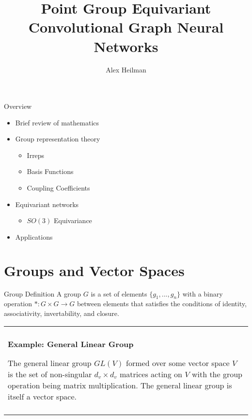 \documentclass[11pt]{beamer}
\title{Point Group Equivariant Convolutional Graph Neural Networks}
\author{Alex Heilman}
\newenvironment{boxed2}
    {\begin{center}
    \begin{tabular}{|p{0.95\textwidth}|}
    \hline\\
    }
    { 
    \\\\\hline
    \end{tabular} 
    \end{center}
    }
\begin{document}
\begin{frame}
\titlepage
\end{frame}


\begin{frame}{Overview}
\begin{itemize}
	\item Brief review of mathematics
	\item Group representation theory
	\begin{itemize}
	\item Irreps
	\item Basis Functions
	\item Coupling Coefficients
	\end{itemize}
	\item Equivariant networks
	\begin{itemize}
		\item $SO(3)$ Equivariance
	\end{itemize}
	\item Applications

\end{itemize}
\end{frame}

\section{Groups and Vector Spaces}

\begin{frame}{Group Definition}
	A group $G$ is a set of elements $\lbrace g_1, ..., g_n\rbrace$ with a binary operation $*:G\times G \rightarrow G$ between elements that satisfies the conditions of identity, associativity, invertability, and closure.
	
	\begin{boxed2}
		
		\vspace{-.5cm}
		
		\textbf{Example: General Linear Group}
		
		The general linear group $GL(V)$ formed over some vector space $V$ is the set of non-singular $d_v\times d_v$ matrices acting on $V$ with the group operation being matrix multiplication. The general linear group is itself a vector space.
	\end{boxed2}
\end{frame}
\end{document}
